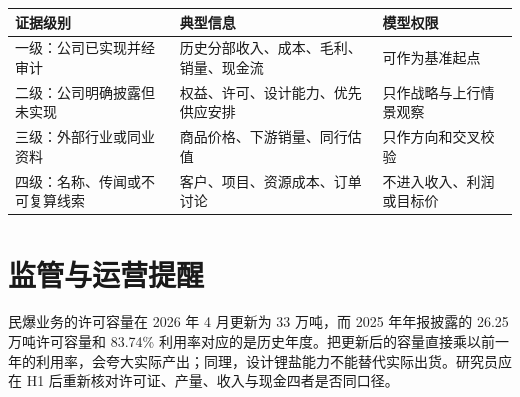 \begin{exhibitbox}[表 A-8：证据资格与模型权限]
\begin{tabularx}{\exhibitboxwidth}{L{3.0cm}X X}
\toprule
证据级别 & 典型信息 & 模型权限 \\
\midrule
一级：公司已实现并经审计 & 历史分部收入、成本、毛利、销量、现金流 & 可作为基准起点 \\
二级：公司明确披露但未实现 & 权益、许可、设计能力、优先供应安排 & 只作战略与上行情景观察 \\
三级：外部行业或同业资料 & 商品价格、下游销量、同行估值 & 只作方向和交叉校验 \\
四级：名称、传闻或不可复算线索 & 客户、项目、资源成本、订单讨论 & 不进入收入、利润或目标价 \\
\bottomrule
\end{tabularx}
\end{exhibitbox}

\section{监管与运营提醒}

民爆业务的许可容量在 2026 年 4 月更新为 33 万吨，而 2025 年年报披露的 26.25 万吨许可容量和 83.74\% 利用率对应的是历史年度。把更新后的容量直接乘以前一年的利用率，会夸大实际产出；同理，设计锂盐能力不能替代实际出货。研究员应在 H1 后重新核对许可证、产量、收入与现金四者是否同口径。

